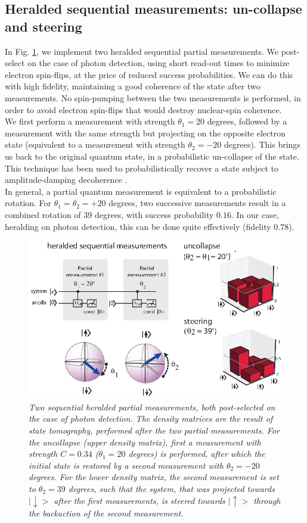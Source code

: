 \subsection{Heralded sequential measurements: un-collapse and steering}
In Fig. \ref{fig:uncollapse}, we implement two heralded sequential partial measurements. We post-select on the case of photon detection, using short read-out times to minimize electron spin-flips, at the price of reduced success probabilities. We can do this with high fidelity, maintaining a good coherence of the state after two measurements. No spin-pumping between the two measurements is performed, in order to avoid electron spin-flips that would destroy nuclear-spin coherence.\\
We first perform a measurement with strength $\theta_1=20$ degrees, followed by a measurement with the same strength but projecting on the opposite electron state (equivalent to a measurement with strength $\theta_2=-20$ degrees). This brings us back to the original quantum state, in a probabilistic un-collapse of the state. This technique has been used to probabilistically recover a state subject to amplitude-damping decoherence \cite{Koashi_Phys.Rev.Lett._1999,Korotkov_Phys.Rev.Lett._2006,Katz_Phys.Rev.Lett._2008}.  \\
In general, a partial quantum measurement is equivalent to a probabilistic rotation. For $\theta_1=\theta_2=+20$ degrees, two successive measurements result in a combined rotation of $39$ degrees, with success probability $0.16$. In our case, heralding on photon detection, this can be done quite effectively (fidelity $0.78$).

\begin{figure} 
\centering
\includegraphics [width = 12 cm]{SOM/fig08_uncollapse.eps}
\caption{\textit{Two sequential heralded partial measurements, both post-selected on the case of photon detection. The density matrices are the result of state tomography, performed after the two partial measurements. For the uncollapse (upper density matrix), first a measurement with strength $C = 0.34$ ($\theta_1=20$ degrees) is performed, after which the initial state is restored by a second measurement with $\theta_2 = -20$ degrees. For the lower density matrix, the second measurement is set to  $\theta_2 = 39$ degrees, such that the system, that was projected towards $|\downarrow >$ after the first measurements,  is steered towards $|\uparrow >$ through the backaction of the second measurement.}}
\label{fig:uncollapse}
\end{figure} 

